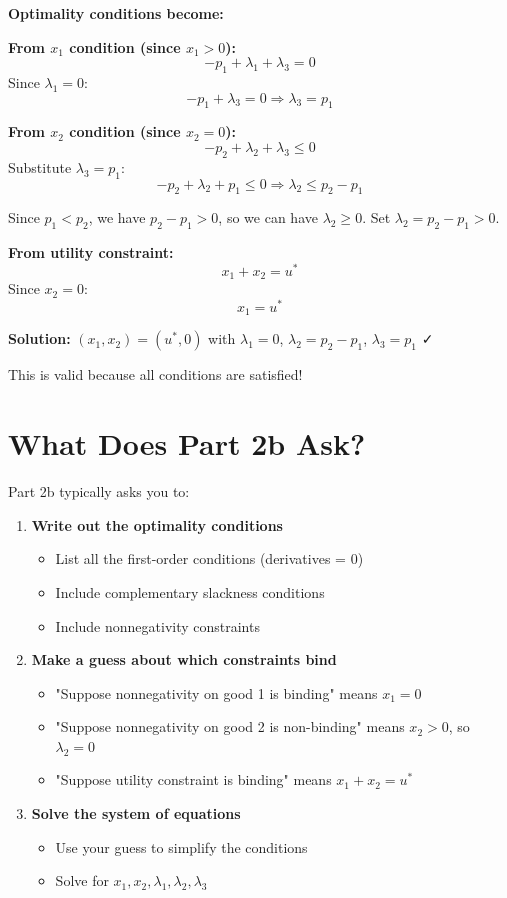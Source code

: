 \documentclass[11pt]{article}
\begin{document}
\textbf{Optimality conditions become:}

\textbf{From $x_1$ condition (since $x_1 > 0$):}
$$-p_1 + \lambda_1 + \lambda_3 = 0$$
Since $\lambda_1 = 0$:
$$-p_1 + \lambda_3 = 0 \Rightarrow \lambda_3 = p_1$$

\textbf{From $x_2$ condition (since $x_2 = 0$):}
$$-p_2 + \lambda_2 + \lambda_3 \leq 0$$
Substitute $\lambda_3 = p_1$:
$$-p_2 + \lambda_2 + p_1 \leq 0 \Rightarrow \lambda_2 \leq p_2 - p_1$$

Since $p_1 < p_2$, we have $p_2 - p_1 > 0$, so we can have $\lambda_2 \geq 0$. Set $\lambda_2 = p_2 - p_1 > 0$.

\textbf{From utility constraint:}
$$x_1 + x_2 = u^*$$
Since $x_2 = 0$:
$$x_1 = u^*$$

\textbf{Solution:} $(x_1, x_2) = (u^*, 0)$ with $\lambda_1 = 0$, $\lambda_2 = p_2 - p_1$, $\lambda_3 = p_1$ ✓

This is valid because all conditions are satisfied!

\section{What Does Part 2b Ask?}

Part 2b typically asks you to:

\begin{enumerate}
\item \textbf{Write out the optimality conditions}
\begin{itemize}
\item List all the first-order conditions (derivatives = 0)
\item Include complementary slackness conditions
\item Include nonnegativity constraints
\end{itemize}

\item \textbf{Make a guess about which constraints bind}
\begin{itemize}
\item "Suppose nonnegativity on good 1 is binding" means $x_1 = 0$
\item "Suppose nonnegativity on good 2 is non-binding" means $x_2 > 0$, so $\lambda_2 = 0$
\item "Suppose utility constraint is binding" means $x_1 + x_2 = u^*$
\end{itemize}

\item \textbf{Solve the system of equations}
\begin{itemize}
\item Use your guess to simplify the conditions
\item Solve for $x_1, x_2, \lambda_1, \lambda_2, \lambda_3$
\end{itemize}
\end{enumerate}
\end{document}
